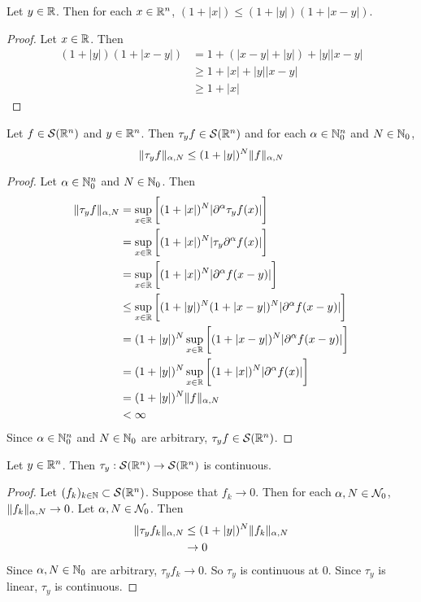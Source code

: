 \documentclass{book}
\begin{document}
	\begin{ex} 
		Let $y \in \mathbb{R}$. Then for each $x \in \mathbb{R}^n$,  $(1+|x|) \leq (1 + |y|)(1+ |x-y|)$.
	\end{ex}

	\begin{proof}
		Let $x \in \mathbb{R}$. Then 
		\begin{align*}
			(1 + |y|)(1+ |x-y|) 
			& = 1 + (|x-y| + |y|) + |y||x-y| \\
			& \geq 1 + |x| + |y||x-y| \\
			& \geq 1 + |x| 
		\end{align*}
	\end{proof}

	\begin{ex}
		Let $f \in \mathcal{S}(\mathbb{R}^n)$ and $y \in \mathbb{R}^n$. Then $\tau_y f \in \mathcal{S}(\mathbb{R}^n)$ and for each $\alpha \in \mathbb{N}_0^n$ and $N \in \mathbb{N}_0$, 
		$$\|\tau_yf\|_{\alpha, N} \leq (1 + |y|)^N \|f\|_{\alpha, N}$$
	\end{ex}

	\begin{proof}
		Let $\alpha \in \mathbb{N}_0^n$ and $N \in \mathbb{N}_0$. Then 
		\begin{align*}
			\|\tau_y f\|_{\alpha, N}
			& = \sup_{x \in \mathbb{R}} \bigg[ (1+|x|)^N |\partial^{\alpha} \tau_yf(x)|\bigg] \\
			& =  \sup_{x \in \mathbb{R}} \bigg[ (1+|x|)^N | \tau_y\partial^{\alpha} f(x)|\bigg] \\ 
			& =  \sup_{x \in \mathbb{R}} \bigg[ (1+|x|)^N |\partial^{\alpha} f(x - y)|\bigg] \\ 
			& \leq \sup_{x \in \mathbb{R}} \bigg[ (1+|y|)^N(1 + |x -y|)^N |\partial^{\alpha} f(x - y)|\bigg] \\ 
			& = (1+|y|)^N\sup_{x \in \mathbb{R}} \bigg[ (1 + |x -y|)^N |\partial^{\alpha} f(x - y)|\bigg] \\ 
			& = (1+|y|)^N\sup_{x \in \mathbb{R}} \bigg[ (1 + |x|)^N |\partial^{\alpha} f(x)|\bigg] \\ 
			& = (1+|y|)^N \|f\|_{\alpha, N} \\ 
			& < \infty
		\end{align*}
		Since $\alpha \in \mathbb{N}_0^n$ and $N \in \mathbb{N}_0$ are arbitrary, $\tau_y f \in \mathcal{S}(\mathbb{R}^n)$.
	\end{proof}

	\begin{ex}
		Let $y \in \mathbb{R}^n$. Then $\tau_y: \mathcal{S}(\mathbb{R}^n) \rightarrow \mathcal{S}(\mathbb{R}^n)$ is continuous.
	\end{ex}

	\begin{proof} 
		Let $(f_k)_{k \in \mathbb{N}} \subset \mathcal{S}(\mathbb{R}^n)$. Suppose that $f_k \rightarrow 0$. Then for each $\alpha,N \in \mathcal{N}_0$, $\|f_k\|_{\alpha, N} \rightarrow 0$. 
		Let $\alpha,N \in \mathcal{N}_0$. Then 
		\begin{align*}
			\|\tau_yf_k\|_{\alpha, N} 
			& \leq (1 + |y|)^N\|f_k\|_{\alpha, N} \\
			& \rightarrow 0
		\end{align*}
		Since $\alpha, N \in \mathbb{N}_0$ are arbitrary, $\tau_yf_k \rightarrow 0$. So $\tau_y$  is continuous at $0$. Since $\tau_y$ is linear, $\tau_y$ is continuous.
	\end{proof}
\end{document}
